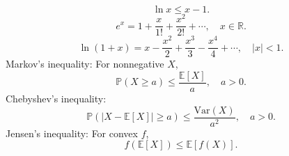 \[\ln{x}\le x-1.\] 
\[e^{x}=1+\frac{x}{1\mathpunct{!}}+\frac{x^{2}}{2\mathpunct{!}}+\cdots,\quad x\in \mathbb{R}.\] 
\[\ln{\left( 1+x \right) }=x-\frac{x^{2}}{2}+\frac{x^{3}}{3}-\frac{x^{4}}{4}+\cdots,\quad \left| x \right| <1.\] 
Markov's inequality: For nonnegative $X$,
\[\mathbb{P}\left( X\ge a \right) \le \frac{\mathbb{E}\left[ X \right]}{a},\quad a>0.\] 
Chebyshev's inequality:
\[\mathbb{P}\left( \left| X-\mathbb{E}\left[ X \right] \right| \ge a \right) \le \frac{\mathrm{Var}\left( X \right)}{a^{2}},\quad a>0.\]
Jensen's inequality: For convex $f$,
\[f\left( \mathbb{E}\left[ X \right] \right) \le \mathbb{E}\left[ f\left( X \right) \right].\]
